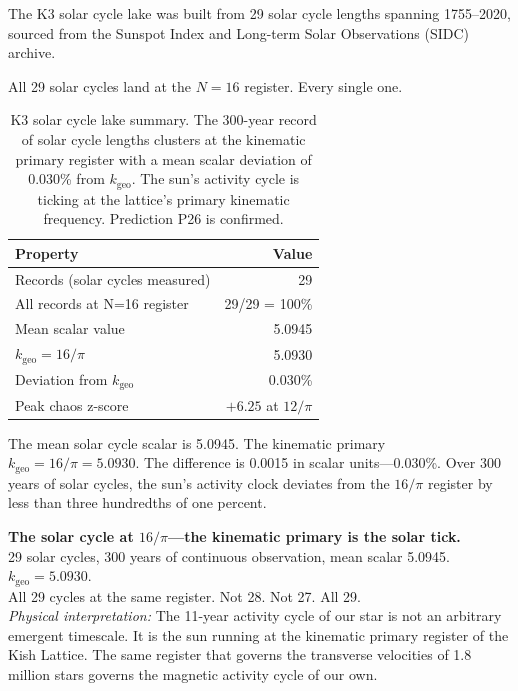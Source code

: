 \documentclass[11pt, letterpaper, openany]{book}
\begin{document}
The K3 solar cycle lake was built from 29 solar cycle lengths spanning
1755--2020, sourced from the Sunspot Index and Long-term Solar Observations
(SIDC) archive.

All 29 solar cycles land at the $N=16$ register. Every single one.

\begin{table}[H]
\centering
\renewcommand{\arraystretch}{1.3}
\begin{tabular}{|l|r|}
\hline
\rowcolor{kishblue!10}
\textbf{Property} & \textbf{Value} \\
\hline\hline
Records (solar cycles measured) & 29 \\
All records at N=16 register & 29/29 = 100\% \\
Mean scalar value & 5.0945 \\
$k_\text{geo} = 16/\pi$ & 5.0930 \\
Deviation from $k_\text{geo}$ & 0.030\% \\
Peak chaos z-score & $+6.25$ at $12/\pi$ \\
\hline
\end{tabular}
\caption{K3 solar cycle lake summary. The 300-year record of solar cycle lengths
clusters at the kinematic primary register with a mean scalar deviation of 0.030\%
from $k_\text{geo}$. The sun's activity cycle is ticking at the lattice's primary
kinematic frequency. Prediction P26 is confirmed.}
\label{tab:k3_solar_cycle}
\end{table}

The mean solar cycle scalar is 5.0945. The kinematic primary $k_\text{geo} = 16/\pi =
5.0930$. The difference is 0.0015 in scalar units---0.030\%. Over 300 years of solar
cycles, the sun's activity clock deviates from the $16/\pi$ register by less than
three hundredths of one percent.

\begin{signalbox}
\textbf{The solar cycle at $16/\pi$---the kinematic primary is the solar tick.}\\[0.5em]
29 solar cycles, 300 years of continuous observation, mean scalar 5.0945.\\
$k_\text{geo} = 5.0930$.\\
All 29 cycles at the same register. Not 28. Not 27. All 29.\\[0.5em]
\textit{Physical interpretation:} The 11-year activity cycle of our star is not an
arbitrary emergent timescale. It is the sun running at the kinematic primary
register of the Kish Lattice. The same register that governs the transverse
velocities of 1.8 million stars governs the magnetic activity cycle of our own.
\end{signalbox}
\end{document}
